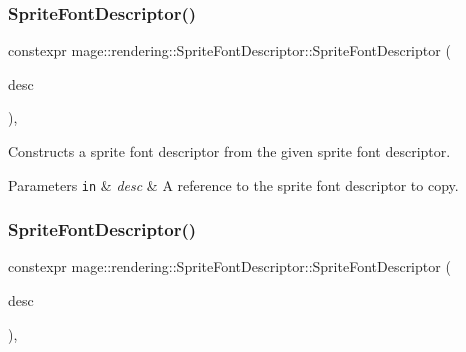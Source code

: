 \subsubsection{\texorpdfstring{Sprite\+Font\+Descriptor()}{SpriteFontDescriptor()}\hspace{0.1cm}{\footnotesize\ttfamily [2/3]}}
{\footnotesize\ttfamily constexpr mage\+::rendering\+::\+Sprite\+Font\+Descriptor\+::\+Sprite\+Font\+Descriptor (\begin{DoxyParamCaption}\item[{const \mbox{\hyperlink{classmage_1_1rendering_1_1_sprite_font_descriptor}{Sprite\+Font\+Descriptor}} \&}]{desc }\end{DoxyParamCaption})\hspace{0.3cm}{\ttfamily [default]}, {\ttfamily [noexcept]}}

Constructs a sprite font descriptor from the given sprite font descriptor.


\begin{DoxyParams}[1]{Parameters}
\mbox{\tt in}  & {\em desc} & A reference to the sprite font descriptor to copy. \\
\hline
\end{DoxyParams}
\mbox{\label{classmage_1_1rendering_1_1_sprite_font_descriptor_a1a84c848b090000d444fdade6ca171e2}} 
\subsubsection{\texorpdfstring{Sprite\+Font\+Descriptor()}{SpriteFontDescriptor()}\hspace{0.1cm}{\footnotesize\ttfamily [3/3]}}
{\footnotesize\ttfamily constexpr mage\+::rendering\+::\+Sprite\+Font\+Descriptor\+::\+Sprite\+Font\+Descriptor (\begin{DoxyParamCaption}\item[{\mbox{\hyperlink{classmage_1_1rendering_1_1_sprite_font_descriptor}{Sprite\+Font\+Descriptor}} \&\&}]{desc }\end{DoxyParamCaption})\hspace{0.3cm}{\ttfamily [default]}, {\ttfamily [noexcept]}}

